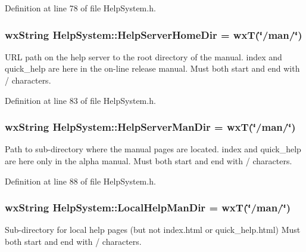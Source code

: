 Definition at line 78 of file Help\+System.\+h.

\subsubsection[{\texorpdfstring{Help\+Server\+Home\+Dir}{HelpServerHomeDir}}]{ wx\+String Help\+System\+::\+Help\+Server\+Home\+Dir = wxT(\char`\"{}/man/\char`\"{})\hspace{0.3cm}{\ttfamily [static]}}\hypertarget{class_help_system_aa34b17b9fd1cc79ebd0d653c66b50c40}{}\label{class_help_system_aa34b17b9fd1cc79ebd0d653c66b50c40}
U\+RL path on the help server to the root directory of the manual. index and quick\+\_\+help are here in the on-\/line release manual. Must both start and end with \textquotesingle{}/\textquotesingle{} characters. 

Definition at line 83 of file Help\+System.\+h.

\subsubsection[{\texorpdfstring{Help\+Server\+Man\+Dir}{HelpServerManDir}}]{ wx\+String Help\+System\+::\+Help\+Server\+Man\+Dir = wxT(\char`\"{}/man/\char`\"{})\hspace{0.3cm}{\ttfamily [static]}}\hypertarget{class_help_system_aa40a1344319637d1d4085329eb6c92e3}{}\label{class_help_system_aa40a1344319637d1d4085329eb6c92e3}
Path to sub-\/directory where the manual pages are located. index and quick\+\_\+help are here only in the alpha manual. Must both start and end with \textquotesingle{}/\textquotesingle{} characters. 

Definition at line 88 of file Help\+System.\+h.

\subsubsection[{\texorpdfstring{Local\+Help\+Man\+Dir}{LocalHelpManDir}}]{ wx\+String Help\+System\+::\+Local\+Help\+Man\+Dir = wxT(\char`\"{}/man/\char`\"{})\hspace{0.3cm}{\ttfamily [static]}}\hypertarget{class_help_system_a5c232da2ddf467e10a4127b03fbf2e7a}{}\label{class_help_system_a5c232da2ddf467e10a4127b03fbf2e7a}
Sub-\/directory for local help pages (but not index.\+html or quick\+\_\+help.\+html) Must both start and end with \textquotesingle{}/\textquotesingle{} characters. 

